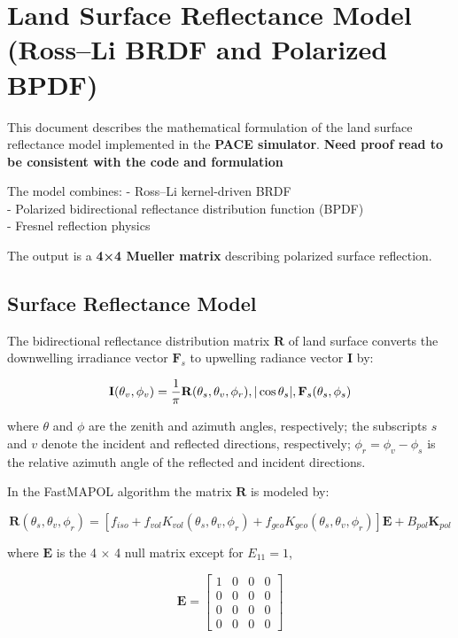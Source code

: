 \documentclass[
  11pt,
  letterpaper,
  DIV=11,
  numbers=noendperiod]{scrreprt}
\begin{document}
\chapter{Land Surface Reflectance Model (Ross--Li BRDF and Polarized
BPDF)}\label{land-surface-reflectance-model-rossli-brdf-and-polarized-bpdf}

This document describes the mathematical formulation of the land surface
reflectance model implemented in the \textbf{PACE simulator}.
\textbf{Need proof read to be consistent with the code and formulation}

The model combines: - Ross--Li kernel-driven BRDF\\
- Polarized bidirectional reflectance distribution function (BPDF)\\
- Fresnel reflection physics

The output is a \textbf{4×4 Mueller matrix} describing polarized surface
reflection.

\section{Surface Reflectance Model}\label{surface-reflectance-model}

The bidirectional reflectance distribution matrix \(\mathbf{R}\) of land
surface converts the downwelling irradiance vector \(\mathbf{F}_s\) to
upwelling radiance vector \(\mathbf{I}\) by:

\[
\mathbf{I}(\theta_v,\phi_v)= \frac{1}{\pi}\mathbf{R}(\theta_s,\theta_v,\phi_r) \\, |\cos\theta_s| \\, \mathbf{F}_s(\theta_s,\phi_s) 
\]

where \(\theta\) and \(\phi\) are the zenith and azimuth angles,
respectively; the subscripts \(s\) and \(v\) denote the incident and
reflected directions, respectively; \(\phi_r=\phi_v-\phi_s\) is the
relative azimuth angle of the reflected and incident directions.

In the FastMAPOL algorithm the matrix \(\mathbf{R}\) is modeled by:

\[
\mathbf{R}(\theta_s,\theta_v,\phi_r) =
\left[
f_{iso}
+
f_{vol} K_{vol}(\theta_s,\theta_v,\phi_r)
+
f_{geo} K_{geo}(\theta_s,\theta_v,\phi_r)
\right]\mathbf{E}
+
B_{pol}\mathbf{K}_{pol}
\]

where \(\mathbf{E}\) is the 4 \(\times\) 4 null matrix except for
\(E_{11}=1\),

\[
\mathbf{E} =
\begin{bmatrix}
1 & 0 & 0 & 0 \\
0 & 0 & 0 & 0 \\
0 & 0 & 0 & 0 \\
0 & 0 & 0 & 0
\end{bmatrix}
\]
\end{document}
